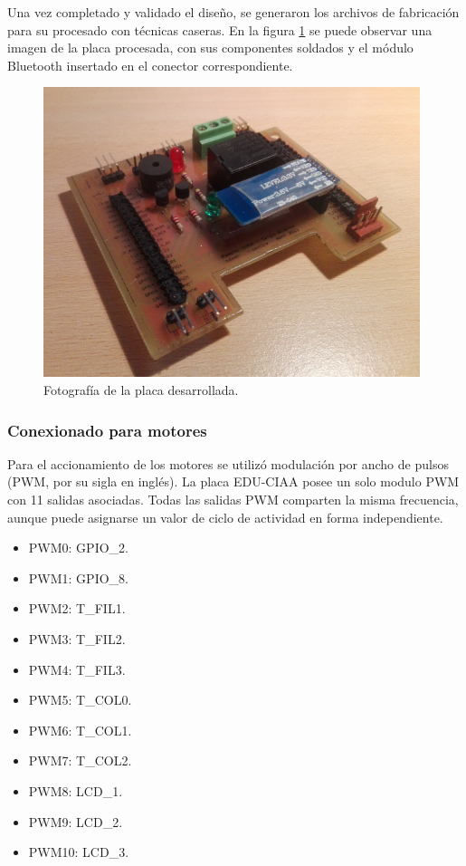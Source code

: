 \pagebreak

Una vez completado y validado el diseño, se generaron los archivos de fabricación para su procesado con técnicas caseras. 
En la figura \ref{fig:placafoto1} se puede observar una  imagen de la placa procesada, con sus componentes soldados y el módulo Bluetooth insertado en el conector correspondiente.


\begin{figure}[h]
	\centering
	\includegraphics[width=11cm]{./Figures/placafoto.png}
	\caption{Fotografía de la placa desarrollada.}
	\label{fig:placafoto1}
\end{figure}

		\subsubsection{Conexionado para motores}

Para el accionamiento de los motores se utilizó modulación por ancho de pulsos (PWM, por su sigla en inglés). La placa EDU-CIAA posee un solo modulo PWM con 11 salidas asociadas. Todas las salidas PWM comparten la misma frecuencia, aunque puede asignarse un valor de ciclo de actividad en forma independiente.

\begin{itemize}
	\item PWM0:  GPIO\_2.
	\item PWM1:  GPIO\_8.
	\item PWM2:  T\_FIL1.
	\item PWM3:  T\_FIL2.
	\item PWM4:  T\_FIL3.
	\item PWM5:  T\_COL0.
	\item PWM6:  T\_COL1.
	\item PWM7:  T\_COL2.
	\item PWM8:  LCD\_1.
	\item PWM9:  LCD\_2.		
	\item PWM10: LCD\_3.				
\end{itemize}

